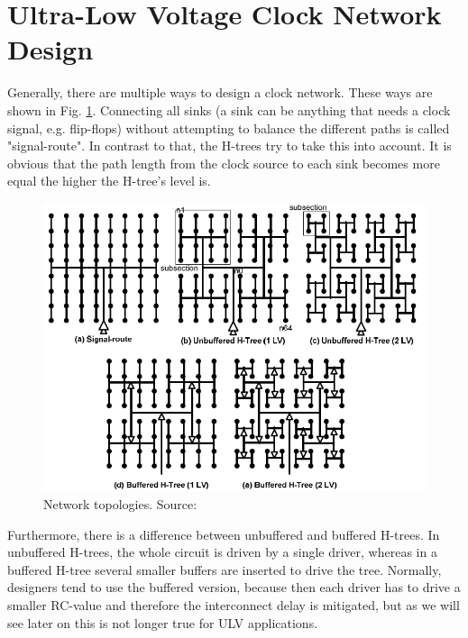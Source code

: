 \documentclass[conference]{IEEEtran}
\begin{document}
\section{Ultra-Low Voltage Clock Network Design} \label{sec:ulv_design}

Generally, there are multiple ways to design a clock network. These ways are shown in Fig. \ref{fig:network_topologies}. Connecting all sinks (a sink can be anything that needs a clock signal, e.g. flip-flops) without attempting to balance the different paths is called "signal-route". In contrast to that, the H-trees try to take this into account. It is obvious that the path length from the clock source to each sink becomes more equal the higher the H-tree's level is.

\begin{figure}[htbp]
	\includegraphics[width=\linewidth]{img/network_topologies.png}
	\centering
	\caption{Network topologies. Source: \cite{b1}}
	\label{fig:network_topologies}
\end{figure}

Furthermore, there is a difference between unbuffered and buffered H-trees. In unbuffered H-trees, the whole circuit is driven by a single driver, whereas in a buffered H-tree several smaller buffers are inserted to drive the tree. Normally, designers tend to use the buffered version, because then each driver has to drive a smaller RC-value and therefore the interconnect delay is mitigated, but as we will see later on this is not longer true for ULV applications.
\end{document}
